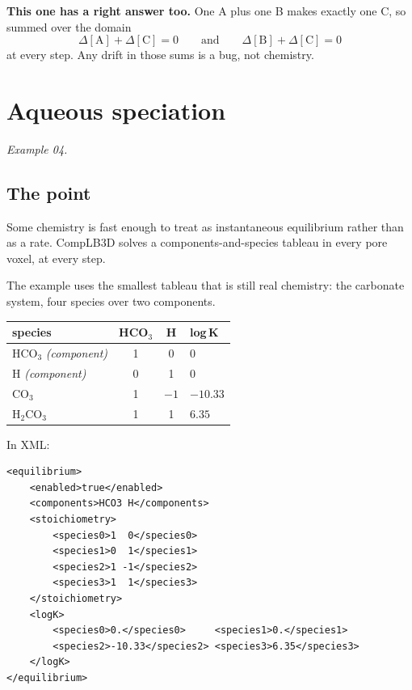 \begin{cbnote}
\textbf{\color{cbTeal}This one has a right answer too.}\quad
One A plus one B makes exactly one C, so summed over the domain
\[
  \Delta[\mathrm{A}] + \Delta[\mathrm{C}] = 0
  \qquad\text{and}\qquad
  \Delta[\mathrm{B}] + \Delta[\mathrm{C}] = 0
\]
at every step. Any drift in those sums is a bug, not chemistry.
\end{cbnote}

\chapter{Aqueous speciation}
\label{ch:equilibrium}

\emph{Example 04.}

\section{The point}

Some chemistry is fast enough to treat as instantaneous equilibrium rather than
as a rate. CompLB3D solves a components-and-species tableau in every pore
voxel, at every step.

The example uses the smallest tableau that is still real chemistry: the
carbonate system, four species over two components.

\begin{center}
\begin{tabular}{@{}lccl@{}}
\toprule
\textbf{species} & \textbf{HCO$_3$} & \textbf{H} & \textbf{log\,K}\\
\midrule
HCO$_3$ \emph{(component)}  & 1 & 0 & 0\\
H \emph{(component)}        & 0 & 1 & 0\\
CO$_3$                      & 1 & $-1$ & $-10.33$\\
H$_2$CO$_3$                 & 1 & 1 & $6.35$\\
\bottomrule
\end{tabular}
\end{center}

In XML:

\begin{lstlisting}[style=xml]
<equilibrium>
    <enabled>true</enabled>
    <components>HCO3 H</components>
    <stoichiometry>
        <species0>1  0</species0>
        <species1>0  1</species1>
        <species2>1 -1</species2>
        <species3>1  1</species3>
    </stoichiometry>
    <logK>
        <species0>0.</species0>     <species1>0.</species1>
        <species2>-10.33</species2> <species3>6.35</species3>
    </logK>
</equilibrium>
\end{lstlisting}

